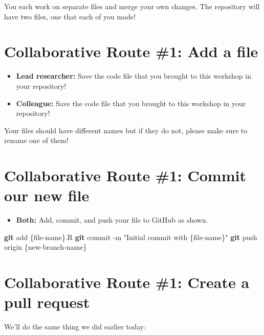 \documentclass[
]{book}
\newenvironment{Shaded}{\begin{snugshade}}{\end{snugshade}}
\newcommand{\AttributeTok}[1]{\textcolor[rgb]{0.13,0.29,0.53}{#1}}
\newcommand{\FunctionTok}[1]{\textcolor[rgb]{0.13,0.29,0.53}{\textbf{#1}}}
\newcommand{\NormalTok}[1]{#1}
\newcommand{\StringTok}[1]{\textcolor[rgb]{0.31,0.60,0.02}{#1}}
\providecommand{\tightlist}{%
  \setlength{\itemsep}{0pt}\setlength{\parskip}{0pt}}
\begin{document}
You each work on separate files and merge your own changes. The repository will have two files, one that each of you made!

\hypertarget{collaborative-route-1-add-a-file}{%
\section{Collaborative Route \#1: Add a file}\label{collaborative-route-1-add-a-file}}

\begin{itemize}
\tightlist
\item
  \textbf{Lead researcher:} Save the code file that you brought to this workshop in your repository!
\item
  \textbf{Colleague:} Save the code file that you brought to this workshop in your repository!
\end{itemize}

Your files should have different names but if they do not, please make sure to rename one of them!

\hypertarget{collaborative-route-1-commit-our-new-file}{%
\section{Collaborative Route \#1: Commit our new file}\label{collaborative-route-1-commit-our-new-file}}

\begin{itemize}
\tightlist
\item
  \textbf{Both:} Add, commit, and push your file to GitHub as shown.
\end{itemize}

\begin{Shaded}
\begin{Highlighting}[]
\FunctionTok{git}\NormalTok{ add \{file{-}name\}.R}
\FunctionTok{git}\NormalTok{ commit }\AttributeTok{{-}m} \StringTok{"Initial commit with \{file{-}name\}"}
\FunctionTok{git}\NormalTok{ push origin \{new{-}branch{-}name\}}
\end{Highlighting}
\end{Shaded}

\hypertarget{collaborative-route-1-create-a-pull-request}{%
\section{Collaborative Route \#1: Create a pull request}\label{collaborative-route-1-create-a-pull-request}}

We'll do the same thing we did earlier today:
\end{document}
